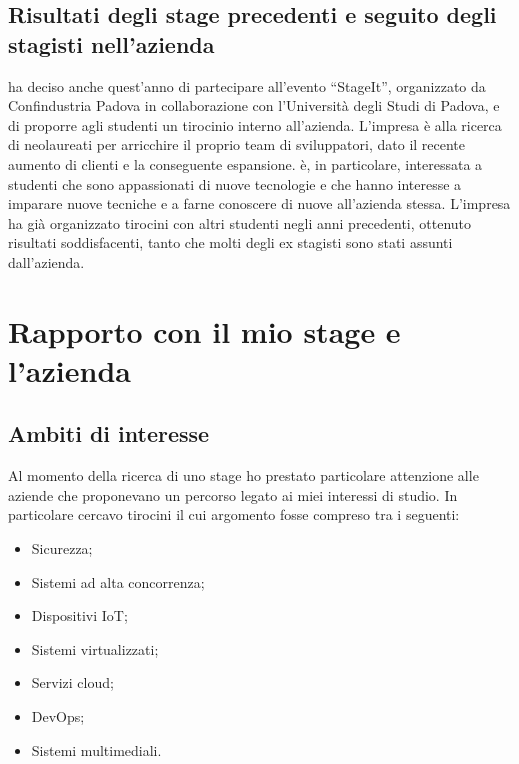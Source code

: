    \subsection{Risultati degli stage precedenti e seguito degli stagisti nell'azienda}
   \nomeAzienda{} ha deciso anche quest'anno di partecipare all'evento ``StageIt'', organizzato da Confindustria Padova in collaborazione con l'Università degli Studi di Padova, e di proporre agli studenti un tirocinio interno all'azienda. L'impresa è alla ricerca di neolaureati per arricchire il proprio team di sviluppatori, dato il recente aumento di clienti e la conseguente espansione.
   \nomeAzienda{} è, in particolare, interessata a studenti che sono appassionati di nuove tecnologie e che hanno interesse a imparare nuove tecniche e a farne conoscere di nuove all'azienda stessa.
   L'impresa ha già organizzato tirocini con altri studenti negli anni precedenti, ottenuto risultati soddisfacenti, tanto che molti degli ex stagisti sono stati assunti dall'azienda.

\section{Rapporto con il mio stage e l'azienda}
   \subsection{Ambiti di interesse}
   Al momento della ricerca di uno stage ho prestato particolare attenzione alle aziende che proponevano un percorso legato ai miei interessi di studio. In particolare cercavo tirocini il cui argomento fosse compreso tra i seguenti:
   \begin{itemize}
      \item{Sicurezza;}
      \item{Sistemi ad alta concorrenza;}
      \item{Dispositivi IoT;}
      \item{Sistemi virtualizzati;}
      \item{Servizi cloud;}
      \item{DevOps;}
      \item{Sistemi multimediali.}
   \end{itemize}


